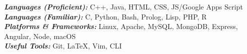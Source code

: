 

\begin{cvparagraph}
  \textbf{\textit{Languages (Proficient): }} C++, Java, HTML, CSS, JS/Google Apps Script\\
  \textbf{\textit{Languages (Familiar): }}C, Python, Bash, Prolog, Lisp, PHP, R \\
  \textbf{\textit{Platforms \& Frameworks: }}Linux, Apache, MySQL, MongoDB, Express, Angular, Node, macOS \\
  \textbf{\textit{Useful Tools: }}Git, \LaTeX, Vim, CLI
\end{cvparagraph}
